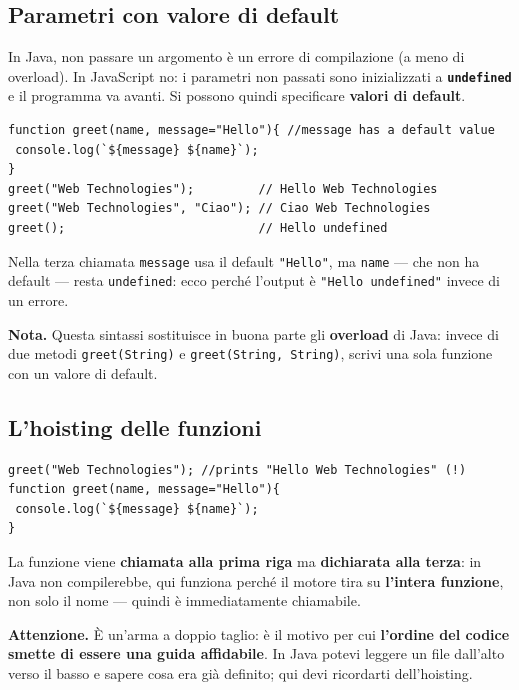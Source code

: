 \documentclass[10pt,a4paper]{article}
\newcommand{\avviso}[1]{\textbf{\textcolor{wamber}{Attenzione.}} #1}
\newcommand{\nota}[1]{\textbf{\textcolor{ngreen}{Nota.}} #1}
\begin{document}
\subsection{Parametri con valore di default}

In Java, non passare un argomento è un errore di compilazione (a meno di overload). In JavaScript no: i parametri non passati sono inizializzati a \textbf{\texttt{undefined}} e il programma va avanti. Si possono quindi specificare \textbf{valori di default}.

\begin{lstlisting}[style=js]
function greet(name, message="Hello"){ //message has a default value
 console.log(`${message} ${name}`);
}
greet("Web Technologies");         // Hello Web Technologies
greet("Web Technologies", "Ciao"); // Ciao Web Technologies
greet();                           // Hello undefined
\end{lstlisting}

Nella terza chiamata \texttt{message} usa il default \texttt{"Hello"}, ma \texttt{name} --- che non ha default --- resta \texttt{undefined}: ecco perché l'output è \texttt{"Hello undefined"} invece di un errore.

\begin{notebox}
\nota{Questa sintassi sostituisce in buona parte gli \textbf{overload} di Java: invece di due metodi \texttt{greet(String)} e \texttt{greet(String, String)}, scrivi una sola funzione con un valore di default.}
\end{notebox}

\subsection{L'hoisting delle funzioni}

\begin{lstlisting}[style=js]
greet("Web Technologies"); //prints "Hello Web Technologies" (!)
function greet(name, message="Hello"){
 console.log(`${message} ${name}`);
}
\end{lstlisting}

La funzione viene \textbf{chiamata alla prima riga} ma \textbf{dichiarata alla terza}: in Java non compilerebbe, qui funziona perché il motore tira su \textbf{l'intera funzione}, non solo il nome --- quindi è immediatamente chiamabile.

\begin{warnbox}
\avviso{È un'arma a doppio taglio: è il motivo per cui \textbf{l'ordine del codice smette di essere una guida affidabile}. In Java potevi leggere un file dall'alto verso il basso e sapere cosa era già definito; qui devi ricordarti dell'hoisting.}
\end{warnbox}
\end{document}
